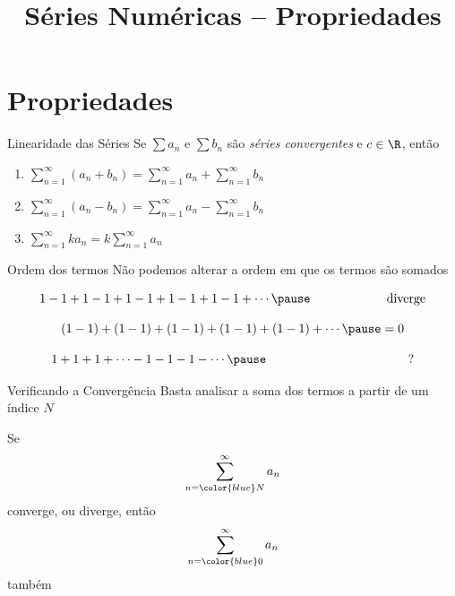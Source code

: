 
\usepackage{integracao_e_series}

\title{Séries Numéricas -- Propriedades}



\addtitle

\section{Propriedades}

\begin{frame}{Linearidade das Séries}
  Se \(\sum a_n\) e \(\sum b_n\)
  são \emph{séries convergentes} e $c\in\R$,
  \pause
  então

  \vspace{\baselineskip}
  \begin{enumerate}[<+->]
    \setlength\itemsep{1em}
    \item \( \sum_{n=1}^\infty (a_n+b_n) =  \sum_{n=1}^\infty a_n +\sum_{n=1}^\infty b_n \)
    \item \( \sum_{n=1}^\infty (a_n-b_n) =  \sum_{n=1}^\infty a_n -\sum_{n=1}^\infty b_n \)
    \item \( \sum_{n=1}^\infty ka_n      = k\sum_{n=1}^\infty a_n \)
  \end{enumerate}
\end{frame}

\begin{frame}{Ordem dos termos}
  Não podemos alterar a ordem em que os termos são somados

  \pause
  \[
    1-1+1-1+1-1+1-1+1-1+\cdots
    \pause
    \hspace{21.5mm}\text{diverge}
  \]

  \pause
  \[
    (1-1)+(1-1)+(1-1)+(1-1)+(1-1)+\cdots
    \pause
    = 0
  \]

  \pause
  \[
    1 + 1 + 1 + \cdots - 1 - 1 - 1 - \cdots
    \pause
    \hspace{40mm}\text{?}
  \]
\end{frame}

\begin{frame}{Verificando a Convergência}
  Basta analisar a soma dos termos a partir de um índice $N$

  \pause
  \vspace{0.5\baselineskip}
  Se
  \[
    \sum_{n={\color{blue}N}}^\infty a_n
  \]
  converge, ou diverge, então
  \[
    \sum_{n={\color{blue}0}}^\infty a_n
  \]
  também
\end{frame}

